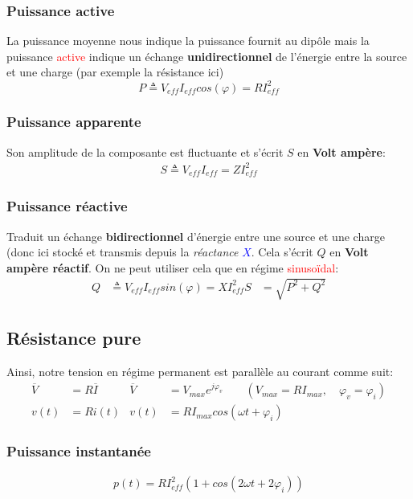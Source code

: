 \documentclass{report}
\begin{document}
\subsubsection{Puissance active}
La puissance moyenne nous indique la puissance fournit au dipôle mais la puissance \textcolor{red}{active} indique un échange \textbf{unidirectionnel} de l'énergie entre la source et une charge (par exemple la résistance ici)
\begin{equation}
P \triangleq V_{eff} I_{eff} cos(\varphi) = R I_{eff}^2
\end{equation}

\subsubsection{Puissance apparente}
Son amplitude de la composante est fluctuante et s'écrit $S$ en \textbf{Volt ampère}:
\begin{align*}
S \triangleq V_{eff} I_{eff} = Z I_{eff}^2
\end{align*}

\subsubsection{Puissance réactive}
Traduit un échange \textbf{bidirectionnel} d'énergie entre une source et une charge (donc ici stocké et transmis depuis la \textit{réactance} \textcolor{blue}{$X$}. Cela s'écrit $Q$ en \textbf{Volt ampère réactif}. On ne peut utiliser cela que en régime \textcolor{red}{sinusoïdal}:
\begin{align*}
Q &\triangleq V_{eff} I_{eff} sin(\varphi) = XI_{eff}^2
S &= \sqrt{P^2 + Q^2}
\end{align*}

\subsection{Résistance pure}
Ainsi, notre tension en régime permanent est parallèle au courant comme suit:
\begin{align*}
\overline{V} &= R \overline{I} & \overline{V} &= V_{max}e^{j \varphi_v} \qquad (V_{max} = R I_{max}, \quad \varphi_v = \varphi_i)\\
v(t) &= R i(t) & v(t) &= R I_{max} cos(\omega t + \varphi_i)
\end{align*} 

\subsubsection{Puissance instantanée}
\begin{align*}
p(t) = RI_{eff}^2 (1 + cos(2 \omega t + 2 \varphi_i))
\end{align*}
\end{document}
